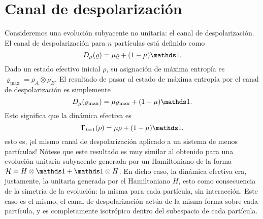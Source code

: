 \section{Canal de despolarización}


Consideremos una evolución subyacente no unitaria: el canal de despolarización. El canal de despolarización para $n$ partículas está definido como
\begin{equation*}
    D_{\mu}(\varrho)=\mu\varrho+(1-\mu)\Id.
\end{equation*}
Dado un estado efectivo inicial $\rho$, su asignación de máxima entropía es $\varrho_{\max}=\rho_{A}\otimes\rho_{B}$. El resultado de pasar al estado de máxima entropía por el canal de despolarización es simplemente
\begin{equation*}
    D_{\mu}(\varrho_{\max})=\mu\varrho_{\max}+(1-\mu)\Id.
\end{equation*}
Esto significa que la dinámica efectiva es
\begin{equation*}
    \Gamma_{t=1}(\rho)=\mu\rho+(1-\mu)\Id,
\end{equation*}
esto es, ¡el mismo canal de despolarización aplicado a un sistema de menos partículas! Nótese que este resultado es muy similar al obtenido para una evolución unitaria subyacente generada por un Hamiltoniano de la forma $\mcH=H\otimes\Id+\Id\otimes H$. En dicho caso, la dinámica efectiva era, justamente, la unitaria generada por el Hamiltoniano $H$, esto como consecuencia de la simetría de la evolución: la misma para cada partícula, sin interacción. Este caso es el mismo, el canal de despolarización actúa de la misma forma sobre cada partícula, y es completamente isotrópico dentro del subespacio de cada partícula.